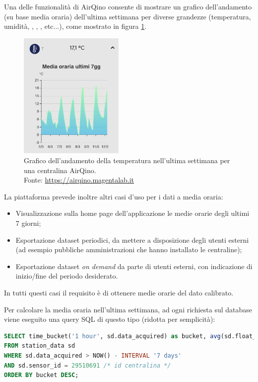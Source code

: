 Una delle funzionalità di AirQino consente di mostrare un grafico dell'andamento (su base media oraria) dell'ultima settimana per diverse grandezze (temperatura, umidità, , , ,  etc...), come mostrato in figura \ref{fig:airqino-temp}.

\begin{figure}[H]
\centering
\captionsetup{justification=centering}
\includegraphics[width=0.45\textwidth,height=\textheight,keepaspectratio]{img/airqino_temp}
\caption{Grafico dell'andamento della temperatura nell'ultima settimana per una centralina AirQino.\\Fonte: \url{https://airqino.magentalab.it}}
\label{fig:airqino-temp}
\end{figure}

La piattaforma prevede inoltre altri casi d’uso per i dati a media oraria:
\begin{itemize}
  \item Visualizzazione sulla home page dell’applicazione le medie orarie degli ultimi 7 giorni;
  \item Esportazione dataset periodici, da mettere a disposizione degli utenti esterni (ad esempio pubbliche amministrazioni che hanno installato le centraline);
  \item Esportazione dataset \textit{on demand} da parte di utenti esterni, con indicazione di inizio/fine del periodo desiderato.
\end{itemize}
In tutti questi casi il requisito è di ottenere medie orarie del dato calibrato.

Per calcolare la media oraria nell'ultima settimana, ad ogni richiesta sul database viene eseguito una query SQL di questo tipo (ridotta per semplicità):

\vspace{1mm}
\begin{lstlisting}[language=sql]
SELECT time_bucket('1 hour', sd.data_acquired) as bucket, avg(sd.float_value)
FROM station_data sd
WHERE sd.data_acquired > NOW() - INTERVAL '7 days'
AND sd.sensor_id = 29510691 /* id centralina */
ORDER BY bucket DESC;
\end{lstlisting}


